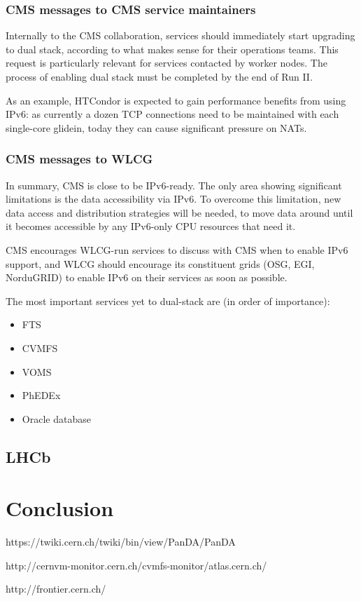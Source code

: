 \subsubsection{CMS messages to CMS service maintainers}
Internally to the CMS collaboration, services should immediately start
upgrading to dual stack, according to what makes sense for their
operations teams. This request is particularly relevant for services
contacted by worker nodes. The process of enabling dual stack must be
completed by the end of Run II.

As an example, HTCondor is expected to gain performance benefits from
using IPv6: as currently a dozen TCP connections need to be maintained
with each single-core glidein, today they can cause significant pressure on
NATs.

\subsubsection{CMS messages to WLCG}
In summary, CMS is close to be IPv6-ready. The only area showing
significant limitations is the data accessibility via IPv6. To
overcome this limitation, new data access and distribution strategies
will be needed, to move data around until it becomes accessible by any
IPv6-only CPU resources that need it.

CMS encourages WLCG-run services to discuss with CMS when to enable
IPv6 support, and WLCG should encourage its constituent grids (OSG,
EGI, NorduGRID) to enable IPv6 on their services as soon as possible.

The most important services yet to dual-stack are (in order of
importance):
\begin{itemize}
\item FTS
\item CVMFS
\item VOMS
\item PhEDEx
\item Oracle database
\end{itemize}

\subsection{LHCb}


\section{Conclusion}


\begin{thebibliography}{99}

 https://twiki.cern.ch/twiki/bin/view/PanDA/PanDA

 http://cernvm-monitor.cern.ch/cvmfs-monitor/atlas.cern.ch/

 http://frontier.cern.ch/

\end{thebibliography}



